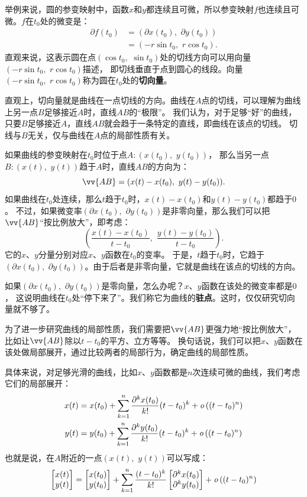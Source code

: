 \documentclass[12pt,UTF8,fontset=none]{ctexbook}
\begin{document}
举例来说，圆的参变映射中，函数$x$和$y$都连续且可微，所以参变映射$f$也连续且可微。$f$在$t_0$处的微变是：
\begin{align*}
    \partial f(t_0) &= (\partial x(t_0),\,\,\partial y(t_0)) \\
    &= (-r\sin{t_0},\,\, r\cos{t_0}).
\end{align*}
直观来说，这表示圆在点$(\cos{t_0},\,\,\sin{t_0})$处的切线方向可以用向量$(-r\sin{t_0},\,\, r\cos{t_0})$描述，
即切线垂直于点到圆心的线段。向量$(-r\sin{t_0},\,\, r\cos{t_0})$称为圆在$t_0$处的\textbf{切向量}。

直观上，切向量就是曲线在一点切线的方向。曲线在$A$点的切线，可以理解为曲线上另一点$B$足够接近$A$时，直线$AB$的“极限”。
我们认为，对于足够“好”的曲线，只要$B$足够接近$A$，直线$AB$就会趋于一条特定的直线，即曲线在该点的切线。
切线与$B$无关，仅与曲线在$A$点的局部性质有关。

如果曲线的参变映射在$t_0$时位于点$A:(x(t_0),\,\, y(t_0))$，
那么当另一点$B:(x(t),\,\, y(t))$趋于$A$时，直线$AB$的方向为：
$$ \vv{AB} = (x(t) - x(t_0),\,\, y(t) - y(t_0)). $$
如果曲线在$t_0$处连续，那么$t$趋于$t_0$时，$x(t) - x(t_0)$和$y(t) - y(t_0)$都趋于$0$。
不过，如果微变率$(\partial x(t_0),\,\,\partial y(t_0))$是非零向量，那么我们可以把$\vv{AB}$“按比例放大”，即考虑：
$$ \left(\frac{x(t) - x(t_0)}{t - t_0},\,\, \frac{y(t) - y(t_0)}{t - t_0}\right).$$
它的$x$、$y$分量分别对应$x$、$y$函数在$t_0$的变率。
于是，$t$趋于$t_0$时，它趋于$(\partial x(t_0),\,\,\partial y(t_0))$。由于后者是非零向量，它就是曲线在该点的切线的方向。

如果$(\partial x(t_0),\,\,\partial y(t_0))$是零向量，怎么办呢？$x$、$y$函数在该处的微变率都是$0$，
这说明曲线在$t_0$处“停下来了”。我们称它为曲线的\textbf{驻点}。这时，仅仅研究切向量就不够了。

为了进一步研究曲线的局部性质，我们需要把$\vv{AB}$更强力地“按比例放大”，比如让$\vv{AB}$除以$t - t_0$的平方、立方等等。
换句话说，我们可以把$x$、$y$函数在该处做局部展开，通过比较两者的局部行为，确定曲线的局部性质。

具体来说，对足够光滑的曲线，比如$x$、$y$函数都是$n$次连续可微的曲线，我们考虑它们的局部展开：
\begin{align*}
    x(t) &= x(t_0) + \sum_{k=1}^n \frac{\partial^k x (t_0)}{k!}(t - t_0)^k + \mathit{o}\left((t - t_0)^n\right) \\
    y(t) &= y(t_0) + \sum_{k=1}^n \frac{\partial^k y (t_0)}{k!}(t - t_0)^k + \mathit{o}\left((t - t_0)^n\right)
\end{align*}
也就是说，在$A$附近的一点$(x(t),\,\, y(t))$可以写成：
$$
\begin{bmatrix}
    x(t) \\ y(t)
\end{bmatrix}
=
\begin{bmatrix}
    x(t_0) \\ y(t_0)
\end{bmatrix}
+
\sum_{k=1}^n \frac{(t - t_0)^k}{k!}
\begin{bmatrix}
    \partial^k x(t_0) \\ \partial^k y(t_0)
\end{bmatrix}
+
\mathit{o}\left((t - t_0)^n\right)
$$
\end{document}
